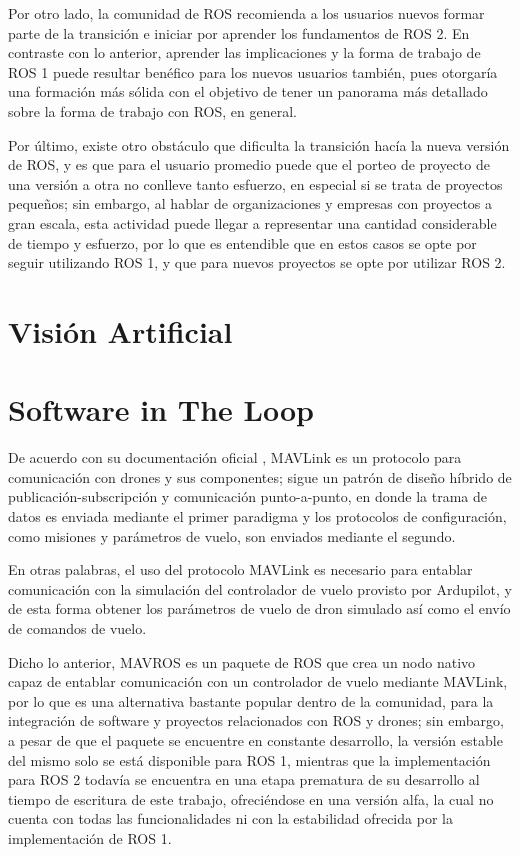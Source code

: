 Por otro lado, la comunidad de ROS recomienda a los usuarios nuevos formar parte de la transición e iniciar por aprender los fundamentos de ROS 2. En contraste con lo anterior, aprender las implicaciones y la forma de trabajo de ROS 1 puede resultar benéfico para los nuevos usuarios también, pues otorgaría una formación más sólida con el objetivo de tener un panorama más detallado sobre la forma de trabajo con ROS, en general.

Por último, existe otro obstáculo que dificulta la transición hacía la nueva versión de ROS, y es que para el usuario promedio puede que el porteo de proyecto de una versión a otra no conlleve tanto esfuerzo, en especial si se trata de proyectos pequeños; sin embargo, al hablar de organizaciones y empresas con proyectos a gran escala, esta actividad puede llegar a representar una cantidad considerable de tiempo y esfuerzo, por lo que es entendible que en estos casos se opte por seguir utilizando ROS 1, y que para nuevos proyectos se opte por utilizar ROS 2.

\section{Visión Artificial}



\section{Software in The Loop}

De acuerdo con su documentación oficial \cite{MAVLink}, MAVLink es un protocolo para comunicación con drones y sus componentes; sigue un patrón de diseño híbrido de publicación-subscripción y comunicación punto-a-punto, en donde la trama de datos es enviada mediante el primer paradigma y los protocolos de configuración, como misiones y parámetros de vuelo, son enviados mediante el segundo.

En otras palabras, el uso del protocolo MAVLink es necesario para entablar comunicación con la simulación del controlador de vuelo provisto por Ardupilot, y de esta forma obtener los parámetros de vuelo de dron simulado así como el envío de comandos de vuelo.

Dicho lo anterior, MAVROS \cite{MAVROS} es un paquete de ROS que crea un nodo nativo capaz de entablar comunicación con un controlador de vuelo mediante MAVLink, por lo que es una alternativa bastante popular dentro de la comunidad, para la integración de software y proyectos relacionados con ROS y drones; sin embargo, a pesar de que el paquete se encuentre en constante desarrollo, la versión estable del mismo solo se está disponible para ROS 1, mientras que la implementación para ROS 2 todavía se encuentra en una etapa prematura de su desarrollo al tiempo de escritura de este trabajo, ofreciéndose en una versión alfa, la cual no cuenta con todas las funcionalidades ni con la estabilidad ofrecida por la implementación de ROS 1.


